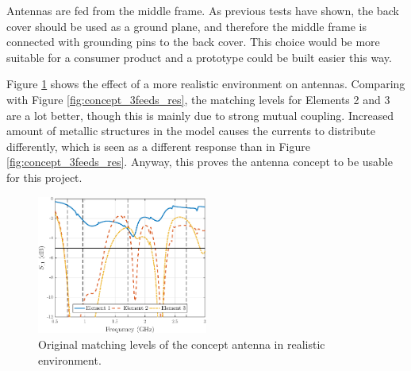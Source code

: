 Antennas are fed from the middle frame. As previous tests have shown, the back cover should be used as a ground plane, and therefore the middle frame is connected with grounding pins to the back cover. This choice would be more suitable for a consumer product and a prototype could be built easier this way. 

Figure \ref{fig:main_orig} shows the effect of a more realistic environment on antennas. Comparing with Figure \ref{fig:concept_3feeds_res}, the matching levels for Elements 2 and 3 are a lot better, though this is mainly due to strong mutual coupling. Increased amount of metallic structures in the model causes the currents to distribute differently, which is seen as a different response than in Figure \ref{fig:concept_3feeds_res}. Anyway, this proves the antenna concept to be usable for this project.
\begin{figure}[H]
    \centering
    \includegraphics[width=0.5\textwidth]{img/main_orig.eps}
    \caption{Original matching levels of the concept antenna in realistic environment.}
    \label{fig:main_orig}
    \vspace{-10pt}
\end{figure}



